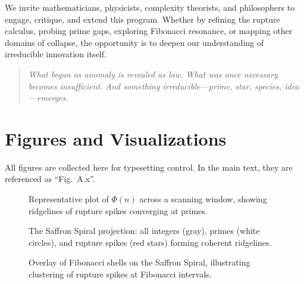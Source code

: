 \documentclass[11pt]{article}
\theoremstyle{plain}
\theoremstyle{definition}
\begin{document}
We invite mathematicians, physicists, complexity theorists, and philosophers to engage, critique, and extend this program. Whether by refining the rupture calculus, probing prime gaps, exploring Fibonacci resonance, or mapping other domains of collapse, the opportunity is to deepen our understanding of irreducible innovation itself.

\begin{quote}
\emph{What began as anomaly is revealed as law.  
What was once necessary becomes insufficient.  
And something irreducible—prime, star, species, idea—emerges.}
\end{quote}

\appendix

\appendix

\section{Figures and Visualizations}\label{app:figs}

All figures are collected here for typesetting control. In the main text, they are referenced as ``Fig.~A.x''.

\begin{figure}[h!]
  \centering
  \caption{Representative plot of $\Phi(n)$ across a scanning window, showing ridgelines of rupture spikes converging at primes.}
  \label{fig:phi-ridgeline}
\end{figure}

\begin{figure}[h!]
  \centering
  \caption{The Saffron Spiral projection: all integers (gray), primes (white circles), and rupture spikes (red stars) forming coherent ridgelines.}
  \label{fig:saffron-spiral}
\end{figure}

\begin{figure}[h!]
  \centering
  \caption{Overlay of Fibonacci shells on the Saffron Spiral, illustrating clustering of rupture spikes at Fibonacci intervals.}
  \label{fig:fibonacci-shells}
\end{figure}
\end{document}
